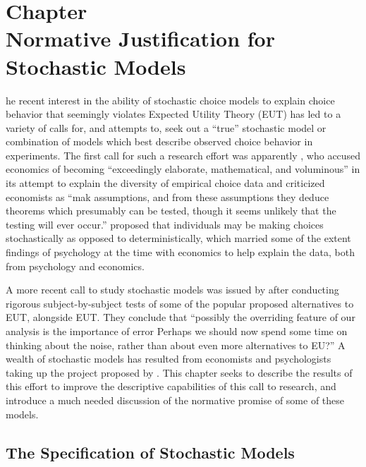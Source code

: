 \documentclass[11pt,a4paper]{report}
\makeatletter
\newcommand{\lltoc}[1]{
	\pagenumbering{gobble}
	\makeatletter
	\@starttoc{toc}%
	\makeatother
	\break
	\pagenumbering{arabic}
}
\let\oldchapter\chapter
\renewcommand{\chapter}[1]{
	\refstepcounter{chapter}%
	\oldchapter*{{\huge Chapter \thechapter}\\[1em]#1}
}
\newcommand{\onlyinsubfile}[1]{#1}
\makeatother
\begin{document}
\onlyinsubfile{
\newpage
\printbibliography[segment=1, heading=subbibliography]
}



\onehalfspacing
\setcounter{chapter}{1}
\chapter{Normative Justification for Stochastic Models}

\lltoc

The recent interest in the ability of stochastic choice models to explain choice behavior that seemingly violates Expected Utility Theory (EUT) has led to a variety of calls for, and attempts to, seek out a \enquote{true} stochastic model or combination of  models which best describe observed choice behavior in experiments.
The first call for such a research effort was apparently \textcite{Edwards1954}, who accused economics of becoming \enquote{exceedingly elaborate, mathematical, and voluminous} \textcite[380]{Edwards1954} in its attempt to explain the diversity of empirical choice data and criticized economists as \enquote{mak assumptions, and from these assumptions they deduce theorems which presumably can be tested, though it seems unlikely that the testing will ever occur.}
\textcite{Edwards1954} proposed that individuals may be making choices stochastically as opposed to deterministically, which married some of the extent findings of psychology at the time with economics to help explain the data, both from psychology and economics.

A more recent call to study stochastic models was issued by \textcite[1321]{Hey1994} after conducting rigorous subject-by-subject tests of some of the popular proposed alternatives to EUT, alongside EUT.
They conclude that \enquote{possibly the overriding feature of our analysis is the importance of error \textelp{} Perhaps we should now spend some time on thinking about the noise, rather than about even more alternatives to EU?}
A wealth of stochastic models has resulted from economists and psychologists taking up the project proposed by \textcite{Hey1994}.
This chapter seeks to describe the results of this effort to improve the descriptive capabilities of this call to research, and introduce a much needed discussion of the normative promise of some of these models.


\section{The Specification of Stochastic Models}
\end{document}
